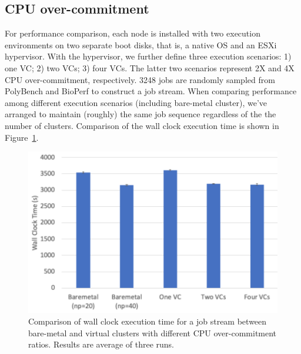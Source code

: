 \subsection{CPU over-commitment}
For performance comparison, each node is installed with two execution environments on two separate boot disks, that is, a native OS and an ESXi hypervisor. With the hypervisor, we further define three execution scenarios: 1) one VC; 2) two VCs; 3) four VCs. The latter two scenarios represent 2X and 4X CPU over-commitment, respectively. 3248 jobs are randomly sampled from PolyBench and BioPerf to construct a job stream. 
When comparing performance among different execution scenarios (including bare-metal cluster), we've arranged to maintain (roughly) the same job sequence 
regardless of the the number of clusters. Comparison of the wall clock execution time is shown in Figure~\ref{fig:cpu_exe_time}.

\begin{figure}[!t]
   \begin{center}
       \includegraphics[width=\columnwidth]{Figures/cpu_exe_time.pdf}
   \end{center}
   \caption{Comparison of wall clock execution time for a job stream between bare-metal and virtual clusters with different CPU over-commitment ratios. Results are average of three runs.}
   \label{fig:cpu_exe_time}
 \end{figure}

